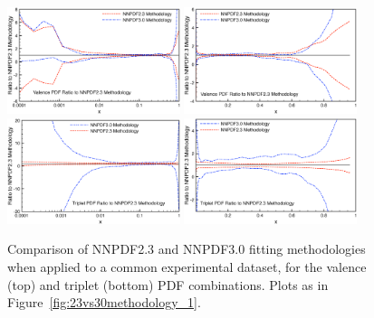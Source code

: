 \begin{figure}[!]
\centering
\includegraphics[width=0.45\textwidth]{7-PostLHC/figs/30meth/plots/vallog.eps}
\includegraphics[width=0.45\textwidth]{7-PostLHC/figs/30meth/plots/vallin.eps}\\
\includegraphics[width=0.45\textwidth]{7-PostLHC/figs/30meth/plots/t3log.eps}
\includegraphics[width=0.45\textwidth]{7-PostLHC/figs/30meth/plots/t3lin.eps}

\caption[Comparison of NNPDF2.3 and NNPDF3.0 fitting methodologies when applied to a common experimental dataset. Valence and triplet PDF combinations]{Comparison of NNPDF2.3 and NNPDF3.0 fitting methodologies when applied to a common experimental dataset, for the valence (top) and triplet (bottom) PDF combinations. Plots as in Figure~\ref{fig:23vs30methodology_1}.}
\label{fig:23vs30methodology_2}
\end{figure}